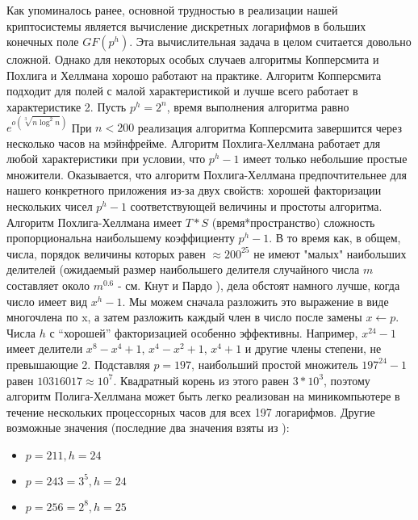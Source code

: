 \documentclass[a4paper,12pt]{article}
\begin{document}
Как упоминалось ранее, основной трудностью в реализации нашей криптосистемы является вычисление дискретных логарифмов в больших конечных поле $GF(p^h)$. Эта вычислительная задача в целом считается довольно сложной. Однако для некоторых особых случаев алгоритмы Копперсмита \cite{9} и Похлига и Хеллмана \cite{23} хорошо работают на практике. Алгоритм Копперсмита подходит для полей с малой характеристикой и лучше всего работает в характеристике 2. 
Пусть $p^h = 2^n$, время выполнения алгоритма равно $e^{o(\sqrt[3]{n {\log^2 n}})}$
При $n < 200$ реализация алгоритма Копперсмита завершится через несколько часов на мэйнфрейме. Алгоритм Похлига-Хеллмана работает для любой характеристики при условии, что $p^h-1$ имеет только небольшие простые множители. Оказывается, что алгоритм Похлига-Хеллмана предпочтительнее для нашего конкретного приложения из-за двух свойств: хорошей факторизации нескольких чисел $p^h - 1$ соответствующей величины и простоты алгоритма. \newline
\indent Алгоритм Похлига-Хеллмана имеет $T*S$ (время*пространство) сложность пропорциональна наибольшему коэффициенту $p^h - 1$.
В то время как, в общем, числа, порядок величины которых равен
$\approx 200^25$ не имеют "малых" наибольших делителей (ожидаемый размер наибольшего делителя случайного числа $m$ составляет около $m^{0.6}$ - см. Кнут и Пардо \cite{16}), дела обстоят намного лучше, когда число имеет вид $x^h-1$. Мы можем сначала разложить это выражение в виде многочлена по x, а затем разложить каждый член в число после замены $x \xleftarrow{} p$. Числа $h$ с “хорошей” факторизацией особенно эффективны. Например, $x^{24}-1$ имеет делители $x^8- x^4 + 1$, $x^4- x^2 +1$, $x^4 +1$ и другие члены степени, не превышающие 2. Подставляя $p =197$, наибольший простой множитель $197^{24}-1$ равен $10316017 \approx 10^7$. Квадратный корень из этого равен $3*10^3$, поэтому алгоритм Полига-Хеллмана может быть легко реализован на миникомпьютере в течение нескольких процессорных часов для всех 197 логарифмов. \newline
\indent Другие возможные значения (последние два значения взяты из \cite{6}):
\begin{itemize}
\item $p = 211, h = 24$
\item $p = 243 = 3^5, h = 24$
\item $p = 256 = 2^8, h = 25$
\end{itemize}
\end{document}
